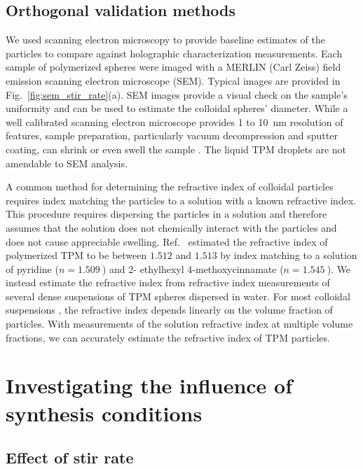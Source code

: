 \subsection{Orthogonal validation methods}

We used scanning electron microscopy to provide baseline estimates of the
particles to compare against holographic characterization measurements.
Each sample of polymerized spheres were imaged with a MERLIN (Carl Zeiss) field
emission scanning electron microscope (SEM).
Typical images are provided in Fig.~\ref{fig:sem_stir_rate}(a).
SEM images provide a visual check on the sample's uniformity
and can be used to estimate the colloidal spheres' diameter. While a well calibrated scanning
electron microscope provides \num{1} to \SI{10}{\nm} resolution of features, sample
preparation, particularly vacuum decompression and sputter coating, can shrink or
even swell the sample \cite{yamada85,jung02}. The liquid TPM droplets
are not amendable to SEM analysis.

A common method for determining the refractive index of colloidal particles
requires index matching the particles to a solution with a known refractive index.
This procedure requires dispersing the particles in a solution and therefore
assumes that the solution does not chemically interact with the particles
and does not cause appreciable swelling.  Ref.~\cite{vanderwel17} estimated the
refractive index of polymerized TPM to be between $\num{1.512}$ and $\num{1.513}$ by index matching
to a solution of pyridine ($n = \SI{1.509}{}$) and \num{2}- ethylhexyl \num{4}-methoxycinnamate
($n = \SI{1.545}{}$). We instead estimate the refractive index from 
refractive index measurements of several dense suspensions of TPM spheres dispersed in water.
For most colloidal suspensions \cite{alexander81}, the refractive index
depends linearly on the volume fraction of particles. With measurements of the solution refractive
index at multiple volume fractions, we can accurately estimate the refractive index of
TPM particles. 

\section{Investigating the influence of synthesis conditions}
\subsection{Effect of stir rate}


